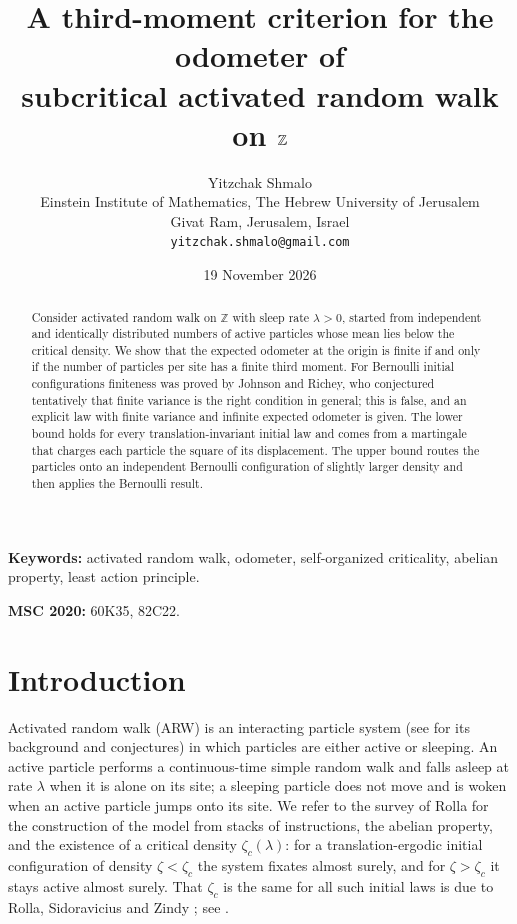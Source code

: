 \documentclass[11pt]{article}
\title{A third-moment criterion for the odometer of\\
subcritical activated random walk on $\Z$}
\author{Yitzchak Shmalo\\
Einstein Institute of Mathematics, The Hebrew University of Jerusalem\\
Givat Ram, Jerusalem, Israel\\
\texttt{yitzchak.shmalo@gmail.com}}
\date{19 November 2026}
\theoremstyle{remark}
\newcommand{\Z}{\mathbb Z}
\newcommand{\1}{\mathbf 1}
\begin{document}
\maketitle

\begin{abstract}
Consider activated random walk on $\Z$ with sleep rate $\lambda>0$, started from independent and identically distributed numbers of active particles whose mean lies below the critical density. We show that the expected odometer at the origin is finite if and only if the number of particles per site has a finite third moment. For Bernoulli initial configurations finiteness was proved by Johnson and Richey, who conjectured tentatively that finite variance is the right condition in general; this is false, and an explicit law with finite variance and infinite expected odometer is given. The lower bound holds for every translation-invariant initial law and comes from a martingale that charges each particle the square of its displacement. The upper bound routes the particles onto an independent Bernoulli configuration of slightly larger density and then applies the Bernoulli result.
\end{abstract}

\noindent\textbf{Keywords:} activated random walk, odometer, self-organized criticality, abelian property, least action principle.

\noindent\textbf{MSC 2020:} 60K35, 82C22.

\section{Introduction}

Activated random walk (ARW) is an interacting particle system (see \cite{DRS} for its background and conjectures) in which particles are either active or sleeping. An active particle performs a continuous-time simple random walk and falls asleep at rate $\lambda$ when it is alone on its site; a sleeping particle does not move and is woken when an active particle jumps onto its site. We refer to the survey of Rolla \cite{Ro} for the construction of the model from stacks of instructions, the abelian property, and the existence of a critical density $\zeta_c(\lambda)$: for a translation-ergodic initial configuration of density $\zeta<\zeta_c$ the system fixates almost surely, and for $\zeta>\zeta_c$ it stays active almost surely. That $\zeta_c$ is the same for all such initial laws is due to Rolla, Sidoravicius and Zindy \cite{RSZ}; see \cite[Theorem~2.13]{Ro}.
\end{document}
